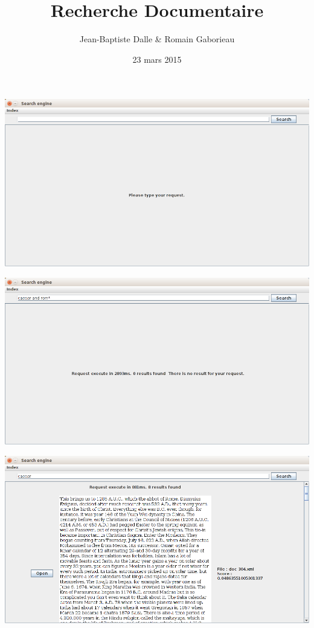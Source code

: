\documentclass{beamer}
\title{Recherche Documentaire}
\author{Jean-Baptiste Dalle \& Romain Gaborieau}
\date{23 mars 2015}
\begin{document}
\maketitle

\begin{frame}


\includegraphics[width=1\linewidth]{img/home}

 
\end{frame}

\begin{frame}


\includegraphics[width=1\linewidth]{img/notfound}

 
\end{frame}

\begin{frame}


\includegraphics[width=1\linewidth]{img/found}

 
\end{frame}
\end{document}

